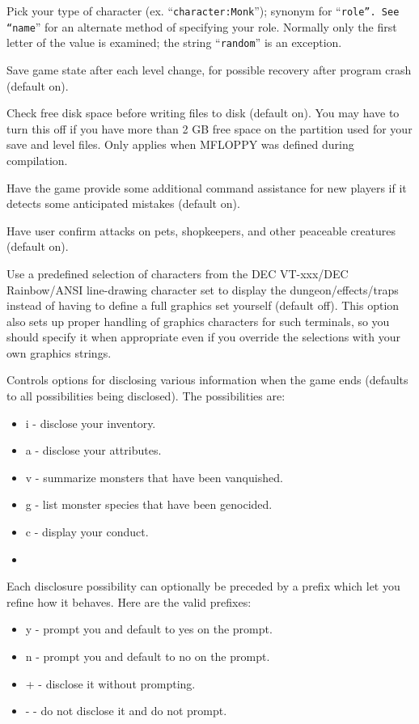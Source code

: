 \item[\tb{character}]
Pick your type of character (ex. ``{\tt character:Monk}'');
synonym for ``{\tt role''.  See ``name}'' for an alternate method
of specifying your role.  Normally only the first letter of
the value is examined; the string ``{\tt random}'' is an exception.
\item[\tb{checkpoint}]
Save game state after each level change, for possible recovery after
program crash (default on).
\item[\tb{checkspace}]
Check free disk space before writing files to disk (default on).
You may have to turn this off if you have more than 2 GB free space
on the partition used for your save and level files.
Only applies when MFLOPPY was defined during compilation.
\item[\tb{cmdassist}]
Have the game provide some additional command assistance for 
new players if it detects some anticipated mistakes (default on).
\item[\tb{``confirm ''}]
Have user confirm attacks on pets, shopkeepers, and other
peaceable creatures (default on).
\item[\tb{DECgraphics}]
Use a predefined selection of characters from the DEC VT-xxx/DEC
Rainbow/ANSI line-drawing character set to display the dungeon/effects/traps
instead of having to define a full graphics set yourself (default off).
This option also sets up proper handling of graphics
characters for such terminals, so you should specify it when appropriate
even if you override the selections with your own graphics strings.
\item[\tb{disclose}]
Controls options for disclosing various information when the game ends (defaults
to all possibilities being disclosed).
The possibilities are:
\item \begin{itemize}
\item i - disclose your inventory.
\item a - disclose your attributes.
\item v - summarize monsters that have been vanquished.
\item g - list monster species that have been genocided.
\item c - display your conduct.
\item \end{itemize}
Each disclosure possibility can optionally be preceded by a prefix which
let you refine how it behaves. Here are the valid prefixes:
\begin{itemize}
\item y - prompt you and default to yes on the prompt.
\item n - prompt you and default to no on the prompt.
\item + - disclose it without prompting.
\item - - do not disclose it and do not prompt.
\end{itemize}
